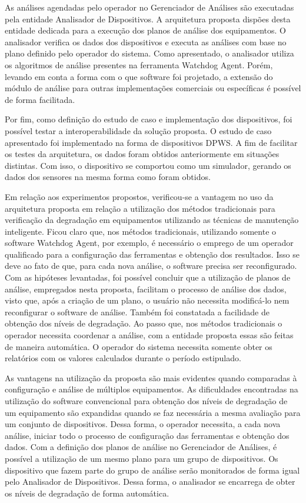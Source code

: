 
As análises agendadas pelo operador no Gerenciador de Análises são executadas pela entidade
Analisador de Dispositivos. A arquitetura proposta dispões desta entidade dedicada para a execução
dos planos de análise dos equipamentos. O analisador verifica os dados dos dispositivos e executa as
análises com base no plano definido pelo operador do sistema. Como apresentado, o analisador utiliza
os algoritmos de análise presentes na ferramenta Watchdog Agent. Porém, levando em conta a forma com
o que software foi projetado, a extensão do módulo de análise para outras implementações comerciais
ou específicas é possível de forma facilitada.

Por fim, como definição do estudo de caso e implementação dos dispositivos, foi possível testar a
interoperabilidade da solução proposta. O estudo de caso apresentado foi implementado na forma de
dispositivos \gls{DPWS}. A fim de facilitar os testes da arquitetura, os dados foram obtidos
anteriormente em situações distintas. Com isso, o dispositivo se comportou como um simulador,
gerando os dados dos sensores na mesma forma como foram obtidos.

Em relação aos experimentos propostos, verificou-se a vantagem no uso da arquitetura proposta em
relação a utilização dos métodos tradicionais para verificação da degradação em equipamentos
utilizando as técnicas de manutenção inteligente. Ficou claro que, nos métodos tradicionais,
utilizando somente o software Watchdog Agent, por exemplo, é necessário o emprego de um operador
qualificado para a configuração das ferramentas e obtenção dos resultados. Isso se deve ao fato de
que, para cada nova análise, o software precisa ser reconfigurado. Com as hipóteses levantadas, foi
possível concluir que a utilização de planos de análise, empregados nesta proposta, facilitam o
processo de análise dos dados, visto que, após a criação de um plano, o usuário não necessita
modificá-lo nem reconfigurar o software de análise. Também foi constatada a facilidade de obtenção
dos níveis de degradação. Ao passo que, nos métodos tradicionais o operador necessita coordenar a
análise, com a entidade proposta essas são feitas de maneira automática. O operador do sistema
necessita somente obter os relatórios com os valores calculados durante o período estipulado.

As vantagens na utilização da proposta são mais evidentes quando comparadas à configuração e análise
de múltiplos equipamentos. As dificuldades encontradas na utilização do software convencional para
obtenção dos níveis de degradação de um equipamento são expandidas quando se faz necessária a mesma
avaliação para um conjunto de dispositivos. Dessa forma, o operador necessita, a cada nova análise,
iniciar todo o processo de configuração das ferramentas e obtenção dos dados. Com a definição dos
planos de análise no Gerenciador de Análises, é possível a utilização de um mesmo plano para um
grupo de dispositivos. Os dispositivo que fazem parte do grupo de análise serão monitorados de forma
igual pelo Analisador de Dispositivos. Dessa forma, o analisador se encarrega de obter os níveis de
degradação de forma automática.

